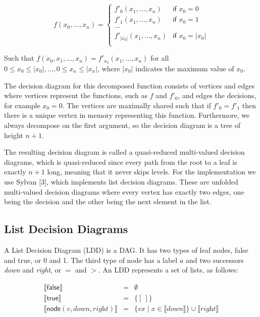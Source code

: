 \documentclass[a4paper]{article}
\newcommand{\var}[1]{\textit{#1}}
\newcommand{\emptylist}{\ensuremath{[\:]}}
\begin{document}
\begin{equation*}
  f(x_0, \ldots, x_n) = 
  \begin{cases}
    f'_0(x_1, \ldots, x_n) &\textsf{if } x_0 = 0 \\
    f'_1(x_1, \ldots, x_n) &\textsf{if } x_0 = 1 \\
    \cdots \\
    f'_{|x_0|}(x_1, \ldots, x_n) &\textsf{if } x_0 = |x_0| \\
  \end{cases}
\end{equation*}

Such that $f(x_0, x_1, \ldots, x_n) = f'_{x_0}(x_1, \ldots, x_n)$ for all $0 \leq x_0 \leq |x_0|, \ldots, 0 \leq x_n \leq |x_n|$, where $|x_0|$ indicates the maximum value of $x_0$.

The decision diagram for this decomposed function consists of vertices and edges where vertices represent the functions, such as $f$ and $f'_0$, and edges the decisions, for example $x_0 = 0$. 
The vertices are maximally shared such that if $f'_0 = f'_1$ then there is a unique vertex in memory representing this function. 
Furthermore, we always decompose on the first argument, so the decision diagram is a tree of height $n+1$.

The resulting decision diagram is called a quasi-reduced multi-valued decision diagrams, which is quasi-reduced since every path from the root to a leaf is exactly $n+1$ long, meaning that it never skips levels. 
For the implementation we use Sylvan [3], which implements list decision diagrams. 
These are unfolded multi-valued decision diagrams where every vertex has exactly two edges, one being the decision and the other being the next element in the list.

\subsection{List Decision Diagrams}

A List Decision Diagram (LDD) is a DAG. It has two types of leaf nodes, \textsf{false} and \textsf{true}, or 0 and 1. The third type of node has a label $a$ and two successors \var{down} and \var{right}, or $=$ and $>$.
An LDD represents a set of lists, as follows:

\begin{equation*}
\begin{array}{lll}
  \llbracket \textsf{false} \rrbracket & = & \emptyset \\
  \llbracket \textsf{true} \rrbracket & = & \{ \emptylist \} \\
  \llbracket \textsf{node}(v, \var{down}, \var{right}) \rrbracket & = & 
    \{ vx \mid x \in \llbracket \var{down} \rrbracket \} \cup \llbracket \var{right} \rrbracket
\end{array}
\end{equation*}
\end{document}
